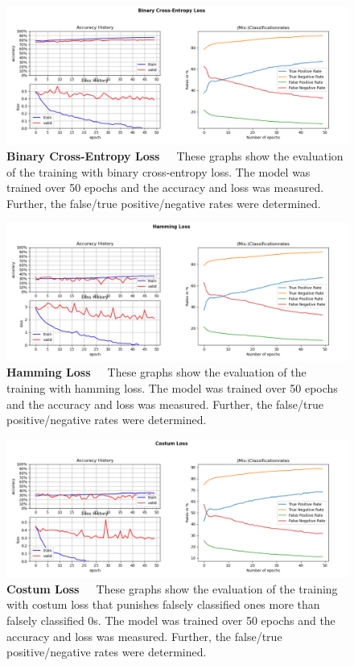\begin{figure}[!htb]
	\centering
	\includegraphics[scale=0.37]{Figures/chapter04/multilabel_crossentropy.png}
	\decoRule
	\caption[Multi-Label Binary Cross-Entropy Loss]{\textbf{Binary Cross-Entropy Loss}~~~These graphs show the evaluation of the training with binary cross-entropy loss. The model was trained over 50 epochs and the accuracy and loss was measured. Further, the false/true positive/negative rates were determined.}
	\label{fig:MultilabelCrossentropy}
\end{figure}

\begin{figure}[!htb]
	\centering
	\includegraphics[scale=0.37]{Figures/chapter04/multilabel_hamming.png}
	\decoRule
	\caption[Multi-Label Hamming Loss]{\textbf{Hamming Loss}~~~These graphs show the evaluation of the training with hamming loss. The model was trained over 50 epochs and the accuracy and loss was measured. Further, the false/true positive/negative rates were determined.}
	\label{fig:MultilabelHammingLoss}
\end{figure}

\begin{figure}[!htb]
	\centering
	\includegraphics[scale=0.37]{Figures/chapter04/multilabel_costum.png}
	\decoRule
	\caption[Multi-Label Costum Loss]{\textbf{Costum Loss}~~~These graphs show the evaluation of the training with costum loss that punishes falsely classified ones more than falsely classified 0s. The model was trained over 50 epochs and the accuracy and loss was measured. Further, the false/true positive/negative rates were determined.}
	\label{fig:MultilabelCostumLoss}
\end{figure}

